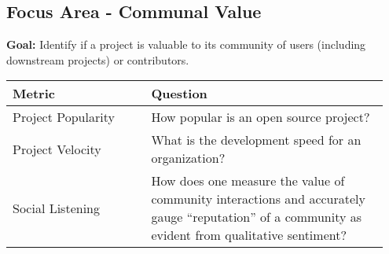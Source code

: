 
\subsection{Focus Area - Communal Value}
\textbf{Goal:} Identify if a project is valuable to its community of users (including downstream projects) or contributors.
\begin{table}[ht!]
    \centering
    \begin{tabular}{|p{0.35\linewidth} | p{0.6\linewidth}|}
        \hline
        \hfil \textbf{Metric}  & \hfil \textbf{Question} \\
        \hline
		Project Popularity & How popular is an open source project? \\ 
		\hline
		Project Velocity & What is the development speed for an organization? \\ 
		\hline
		Social Listening & How does one measure the value of community interactions and accurately gauge “reputation” of a community as evident from qualitative sentiment? \\ 
		\hline
    \end{tabular}
\end{table}

 
 
 
